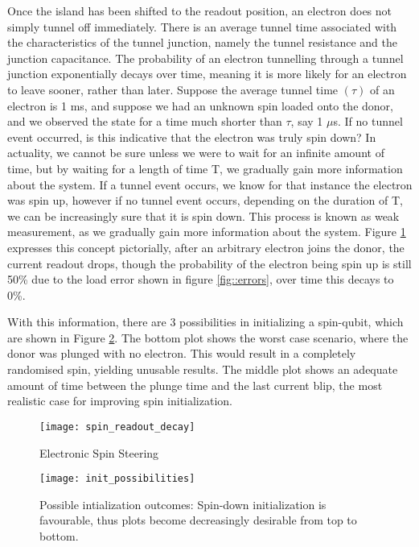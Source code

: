 Once the island has been shifted to the readout position, an electron does not simply tunnel off immediately. There is an average tunnel time associated with the characteristics of the tunnel junction, namely the tunnel resistance and the junction capacitance. The probability of an electron tunnelling through a tunnel junction exponentially decays over time, meaning it is more likely for an electron to leave sooner, rather than later. 
Suppose the average tunnel time $(\tau)$ of an electron is 1 ms, and suppose we had an unknown spin loaded onto the donor, and we observed the state for a time much shorter than $\tau$, say 1 $\mu$s. If no tunnel event occurred, is this indicative that the electron was truly spin down? In actuality, we cannot be sure unless we were to wait for an infinite amount of time, but by waiting for a length of time T, we gradually gain more information about the system. If a tunnel event occurs, we know for that instance the electron was spin up, however if no tunnel event occurs, depending on the duration of T, we can be increasingly sure that it is spin down. This process is known as weak measurement, as we gradually gain more information about the system. Figure \ref{fig::spin_readout_decay} expresses this concept pictorially, after an arbitrary electron joins the donor, the current readout drops, though the probability of the electron being spin up is still 50\% due to the load error shown in figure \ref{fig::errors}, over time this decays to 0\%. 

With this information, there are 3 possibilities in initializing a spin-qubit, which are shown in Figure \ref{fig::init_possibilities}. The bottom plot shows the worst case scenario, where the donor was plunged with no electron. This would result in a completely randomised spin, yielding unusable results. The middle plot shows an adequate amount of time between the plunge time and the last current blip, the most realistic case for improving spin initialization.

\begin{figure}[htbp!]
	\centering
	\texttt{[image: spin\_readout\_decay]}
	\caption{Electronic Spin Steering}
	\label{fig::spin_readout_decay}
\end{figure}

\begin{figure}[htbp!]
	\centering
	\texttt{[image: init\_possibilities]}
	\caption{Possible intialization outcomes: Spin-down initialization is favourable, thus plots become decreasingly desirable from top to bottom.}
	\label{fig::init_possibilities}
\end{figure}

